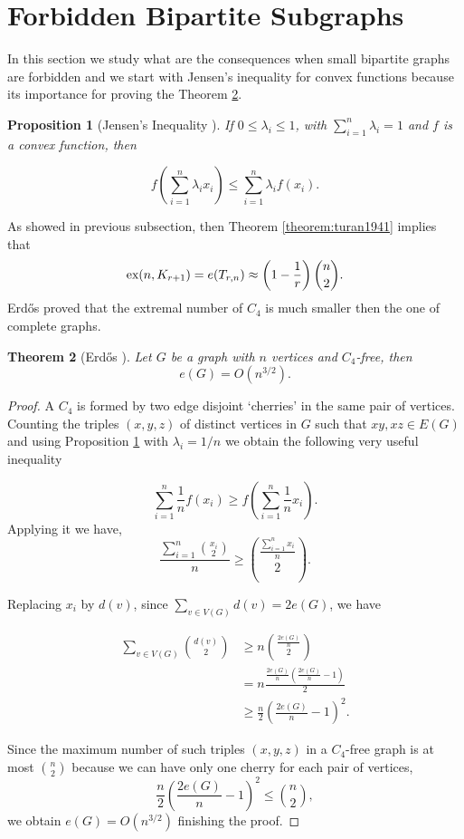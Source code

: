 \documentclass[12pt,twoside,a4paper,bibliography=totocnumbered]{book}
\numberwithin{equation}{section}
\newtheorem{theorem}             {Theorem}[section]
\newtheorem{proposition}[theorem] {Proposition}
\theoremstyle{remark}
\def\ex{\mathop{\text{\rm ex}}\nolimits}
\begin{document}
\section{Forbidden Bipartite Subgraphs}
In this section we study what are the consequences when small bipartite graphs are forbidden and we start with Jensen's inequality for convex functions because its importance for proving the Theorem \ref{theorem: Erdos,1938}.
\begin{proposition}[{Jensen's Inequality \cite{Je06}}]\label{prep:jensen}
 If $0\leq \lambda_i \leq 1$, with $\sum_{i=1}^n \lambda_i = 1$ and $f$ is a convex function, then

$$
f \left( \sum_{i=1}^n \lambda_i x_i\right) \leq \sum_{i=1}^n \lambda_i f (x_i).$$
\end{proposition}
As showed in previous subsection, then Theorem \ref{theorem:turan1941} implies that
$$ \ex (n,K_{r+1}) = e(T_{r,n}) \approx \left( 1-\frac{1}{r}\right) \binom{n}{2} .$$
Erd\H{o}s proved that the extremal number of $C_4$ is much smaller then the one of complete graphs.
 
\begin{theorem}[{Erd\H{o}s \cite{Er38}}] \label{theorem: Erdos,1938} Let $G$ be a graph with $n$ vertices and $C_4$-free, then
$$e(G) = O(n^{3/2}).$$
\end{theorem}

\begin{proof}
A $C_4$ is formed by two edge disjoint `cherries' in the same pair of vertices. Counting the triples $(x,y,z)$ of distinct vertices in $G$ such that $xy, xz \in E(G)$ and using Proposition \ref{prep:jensen} with $\lambda_i = 1/n$ we obtain the following very useful inequality

$$ \sum_{i=1}^n \frac{1}{n} f\left(x_i\right) \geq f\left(\sum_{i=1}^n \frac{1}{n} x_i\right).$$
Applying it we have,
$$ \frac{\sum_{i=1}^n \binom{x_i}{2}}{n} \geq \binom{\frac{\sum_{i=1}^n x_i}{n}}{2}.$$

Replacing $x_i$ by $d(v)$, since $\sum_{v \in V(G)} d(v) = 2e(G)$, we have

\begin{align*}
\sum_{v \in V(G)} \binom{d(v)}{2} &\geq n \binom{\frac{2e(G)}{n}}{2}\\
&= n\frac{\frac{2e(G)}{n}\left( \frac{2e(G)}{n}-1\right)}{2} \\
&\geq \frac{n}{2} \left( \frac{2e(G)}{n} - 1 \right)^2.
\end{align*}

Since the maximum number of such triples $(x,y,z)$ in a $C_4$-free graph is at most $\binom{n}{2}$ because we can have only one cherry for each pair of vertices,
$$ \frac{n}{2}\left(\frac{2e(G)}{n} - 1\right)^2 \leq \binom{n}{2},$$
we obtain $e(G) = O(n^{3/2})$ finishing the proof.
\end{proof}
\end{document}
